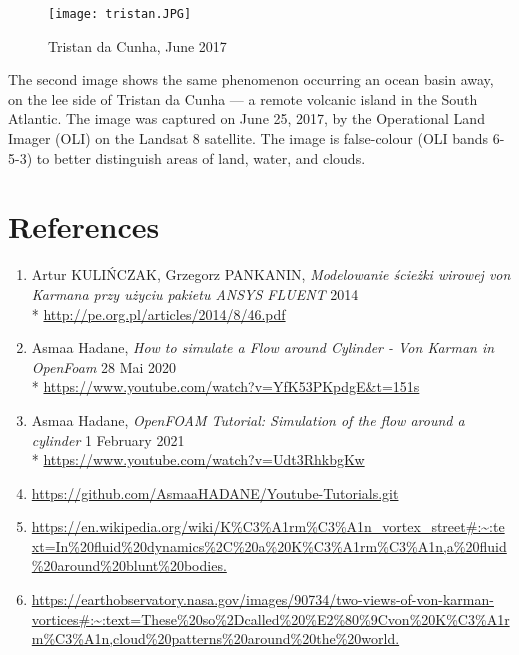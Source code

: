 \documentclass[a4paper,11pt]{article}
\begin{document}
\begin{figure}[h]
  \centering
  \texttt{[image: tristan.JPG]}
  \caption{Tristan da Cunha, June 2017}
\end{figure}

The second image shows the same phenomenon occurring an ocean basin away, on the lee side of Tristan da Cunha — a remote volcanic island in the South Atlantic. The image was captured on June 25, 2017, by the Operational Land Imager (OLI) on the Landsat 8 satellite. The image is false-colour (OLI bands 6-5-3) to better distinguish areas of land, water, and clouds.


\section{References}

\begin{enumerate}

  \item  Artur KULIŃCZAK, Grzegorz PANKANIN, \textit{Modelowanie ścieżki wirowej von Karmana przy użyciu pakietu
          ANSYS FLUENT} 2014
        \\*
        \url{http://pe.org.pl/articles/2014/8/46.pdf}

  \item  Asmaa Hadane, \textit{How to simulate a Flow around Cylinder - Von Karman in OpenFoam} 28 Mai 2020\\*
        \url{https://www.youtube.com/watch?v=YfK53PKpdgE&t=151s}

  \item  Asmaa Hadane, \textit{OpenFOAM Tutorial: Simulation of the flow around a cylinder} 1 February 2021\\*
        \url{https://www.youtube.com/watch?v=Udt3RhkbgKw}

  \item \url{https://github.com/AsmaaHADANE/Youtube-Tutorials.git}

  \item \url{https://en.wikipedia.org/wiki/K%C3%A1rm%C3%A1n_vortex_street#:~:text=In%20fluid%20dynamics%2C%20a%20K%C3%A1rm%C3%A1n,a%20fluid%20around%20blunt%20bodies.}

  \item \url{https://earthobservatory.nasa.gov/images/90734/two-views-of-von-karman-vortices#:~:text=These%20so%2Dcalled%20%E2%80%9Cvon%20K%C3%A1rm%C3%A1n,cloud%20patterns%20around%20the%20world.}

\end{enumerate}
\end{document}
